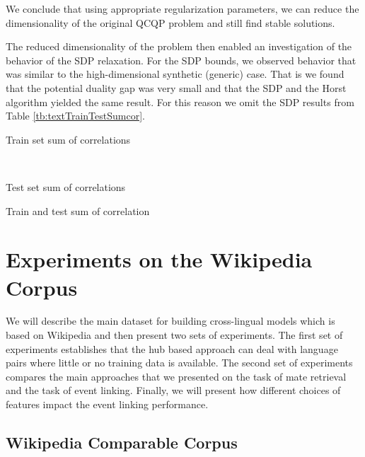 We conclude that using appropriate regularization parameters, 
we can reduce the dimensionality of the
original QCQP problem and still find stable
solutions. 

The reduced dimensionality of the problem then enabled an investigation of
the behavior of the SDP relaxation. For the SDP bounds, we observed behavior that was 
similar to the high-dimensional synthetic (generic) case. That is
we found that the potential duality gap was very small and that the SDP and the Horst algorithm yielded the same
result. For this reason we omit the SDP results from Table \ref{tb:textTrainTestSumcor}.

\begin{table}[t]
    \begin{subtable}[t]{\textwidth}
        \centering
        
        \caption{Train set sum of correlations}
        \label{tb:trainText}
    \end{subtable}
    ~
    \begin{subtable}[t]{\textwidth}
        \centering
        
        \caption{Test set sum of correlations}
        \label{tb:testText}
    \end{subtable}
  \caption{Train and test sum of correlation}
  \label{tb:textTrainTestSumcor}
\end{table}

\section{Experiments on the Wikipedia Corpus}\label{sec:evaluation}

We will describe the main dataset for building cross-lingual models which is 
based on Wikipedia and then present two sets of experiments. The first set of experiments
establishes that the hub based approach can deal with language pairs where little 
or no training data is available. The second set of experiments compares the main approaches
that we presented on the task of mate retrieval and the task of event linking. 
Finally, we will present how different choices of features impact the event linking performance.

\subsection{Wikipedia Comparable Corpus}

